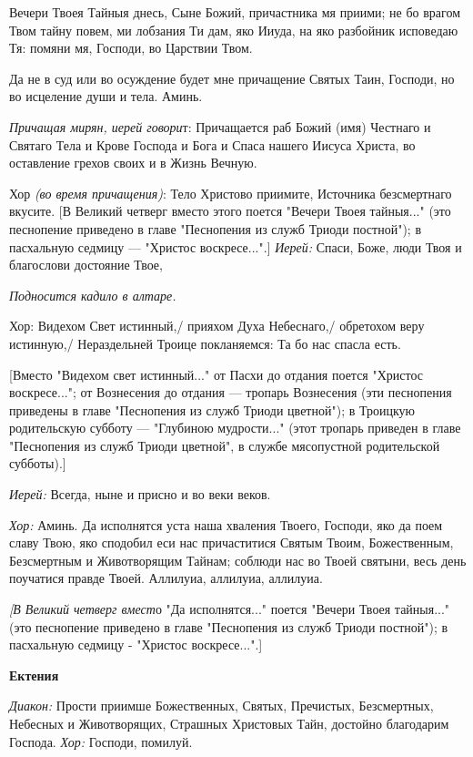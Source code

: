   Вечери Твоея Тайныя днесь, Сыне Божий, причастника мя приими; не бо врагом Твом тайну повем, ми лобзания Ти дам, яко Ииуда, на яко разбойник исповедаю Тя: помяни мя, Господи, во Царствии Твом.

  Да не в суд или во осуждение будет мне причащение Святых Таин, Господи, но во исцеление души и тела. Аминь.

 

{\itshape  Причащая мирян, иерей говори}т: Причащается раб Божий (имя) Честнаго и Святаго Тела и Крове Господа и Бога и Спаса нашего Иисуса Христа, во оставление грехов своих и в Жизнь Вечную. 

Хор {\itshape (во время причащения)}: Тело Христово приимите, Источника безсмертнаго вкусите.
 [В Великий четверг вместо этого поется "Вечери Твоея тайныя..." (это песнопение приведено в главе "Песнопения из служб Триоди постной"); в пасхальную седмицу — "Христос воскресе...".]
 {\itshape Иерей:} Спаси, Боже, люди Твоя и благослови достояние Твое, 

{\itshape Подносится кадило в алтаре.} 

      Хор: Видехом Свет истинный,/ прияхом Духа Небеснаго,/ обретохом веру истинную,/ Нераздельней Троице покланяемся: Та бо нас спасла есть.

      [Вместо "Видехом свет истинный..." от Пасхи до отдания поется "Христос воскресе..."; от Вознесения до отдания — тропарь Вознесения (эти песнопения приведены в главе "Песнопения из служб Триоди цветной"); в Троицкую родительскую субботу — "Глубиною мудрости..." (этот тропарь приведен в главе "Песнопения из служб Триоди цветной", в службе мясопустной родительской субботы).]

{\itshape  Иерей:} Всегда, ныне и присно и во веки веков.

{\itshape  Хор:} Аминь. Да исполнятся уста наша хваления Твоего, Господи, яко да поем славу Твою, яко сподобил еси нас причаститися Святым Твоим, Божественным, Безсмертным и Животворящим Тайнам; соблюди нас во Твоей святыни, весь день поучатися правде Твоей. Аллилуиа, аллилуиа, аллилуиа. 

{\itshape [В Великий четверг вмест}о "Да исполнятся..." поется "Вечери Твоея тайныя..." (это песнопение приведено в главе "Песнопения из служб Триоди постной"); в пасхальную седмицу - "Христос воскресе...".]

 {\bfseries Ектения }

{\itshape  Диакон:} Прости приимше Божественных, Святых, Пречистых, Безсмертных, Небесных и Животворящих, Страшных Христовых Тайн, достойно благодарим Господа. 
{\itshape 
  Хор:} Господи, помилуй. 

